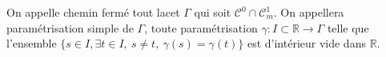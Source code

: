 \begin{definition}
    On appelle chemin fermé tout lacet $\Gamma$ qui soit $\mathcal{C}^0\cap\mathcal{C}^1_m$. On appellera paramétrisation simple de $\Gamma$, toute paramétrisation $\gamma : I\subset\mathbb{R}\longrightarrow\Gamma$ telle que l’ensemble $\{s\in I, \exists t\in I,~s\neq t,~ \gamma(s) = \gamma(t)\}$ est d’intérieur vide dans $\mathbb{R}$.
\end{definition}

